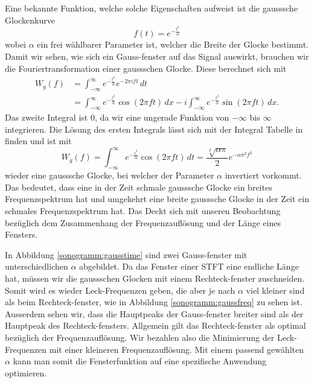 Eine bekannte Funktion, welche solche Eigenschaften aufweist ist die gausssche Glockenkurve
\begin{equation}
    f(t) = e^{-\frac{t^2}{\alpha}}
\end{equation}
wobei $\alpha$ ein frei wählbarer Parameter ist, welcher die Breite der Glocke 
bestimmt.
Damit wir sehen, wie sich ein Gauss-fenster auf das Signal auswirkt, brauchen wir
die Fouriertransformation einer gaussschen Glocke.
Diese berechnet sich mit 
\begin{align}
    W_g(f) &= \int_{-\infty}^{\infty} e^{-\frac{t^2}{\alpha}} e^{- 2 \pi i f t}\, dt\\
    &= \int_{-\infty}^{\infty} e^{-\frac{t^2}{\alpha}} \cos(2 \pi f t)\, dx -
    i \int_{-\infty}^{\infty} e^{-\frac{t^2}{\alpha}} \sin(2 \pi f t)\, dx .
\end{align}
Das zweite Integral ist 0, da wir eine ungerade Funktion von $-\infty$ bis $\infty$ integrieren.
Die Lösung des ersten Integrals lässt sich mit der Integral Tabelle in \cite{sonogramm:bronstein} finden und ist mit
\begin{equation}
    W_g(f) = \int_{-\infty}^{\infty} e^{-\frac{t^2}{\alpha}} \cos(2 \pi f t)\, dt =
    \frac{\sqrt[2]{\alpha \pi}}{2} e^{-\alpha \pi^2 f^2}
\end{equation}
wieder eine gausssche Glocke, bei welcher der Parameter $\alpha$ invertiert vorkommt.
Das bedeutet, dass eine in der Zeit schmale gausssche Glocke ein breites Frequenzspektrum hat und umgekehrt eine
breite gausssche Glocke in der Zeit ein schmales Frequenzspektrum hat.
Das Deckt sich mit unseren Beobachtung bezüglich dem Zusammenhang der 
Frequenzauflösung und der Länge eines Fensters.

In Abbildung \ref{sonogramm:gausstime} sind zwei Gauss-fenster mit unterschiedlichen 
$\alpha$ abgebildet.
Da das Fenster einer STFT eine endliche Länge hat, müssen wir die gaussschen Glocken 
mit einem Rechteck-fenster zuschneiden. 
Somit wird es wieder Leck-Frequenzen geben, die aber je nach $\alpha$ viel kleiner sind
als beim Rechteck-fenster, wie in Abbildung \ref{sonogramm:gaussfreq} zu sehen ist.
Ausserdem sehen wir, dass die Hauptpeaks der Gauss-fenster breiter sind als der 
Hauptpeak des Rechteck-fensters.
Allgemein gilt das Rechteck-fenster als optimal bezüglich der Frequenzauflösung.
Wir bezahlen also die Minimierung der Leck-Frequenzen mit einer kleineren Frequenzauflösung. 
Mit einem passend gewählten $\alpha$ kann man somit die Fensterfunktion auf eine spezifische
Anwendung optimieren.

